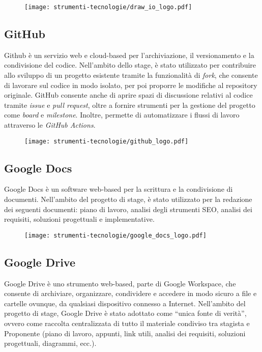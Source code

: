 \begin{figure}[H]
    \centering 
    \texttt{[image: strumenti-tecnologie/draw\_io\_logo.pdf]} 
\end{figure}

\subsection*{GitHub}

\par Github è un servizio web e cloud-based per l'archiviazione, il versionamento e la condivisione del codice. Nell’ambito dello stage, è stato utilizzato per contribuire allo sviluppo di un progetto esistente tramite la funzionalità di \textit{fork}, che consente di lavorare sul codice in modo isolato, per poi proporre le modifiche al repository originale. GitHub consente anche di aprire spazi di discussione relativi al codice tramite \textit{issue} e \textit{pull request}, oltre a fornire strumenti per la gestione del progetto come \textit{board} e \textit{milestone}. Inoltre, permette di automatizzare i flussi di lavoro attraverso le \textit{GitHub Actions}.

\begin{figure}[H]
    \centering 
    \texttt{[image: strumenti-tecnologie/github\_logo.pdf]} 
\end{figure}

\subsection*{Google Docs}

\par Google Docs è un software web-based per la scrittura e la condivisione di documenti. Nell’ambito del progetto di stage, è stato utilizzato per la redazione dei seguenti documenti: piano di lavoro, analisi degli strumenti SEO, analisi dei requisiti, soluzioni progettuali e implementative.

\begin{figure}[H]
    \centering 
    \texttt{[image: strumenti-tecnologie/google\_docs\_logo.pdf]} 
\end{figure}

\subsection*{Google Drive}

\par Google Drive è uno strumento web-based, parte di Google Workspace, che consente di archiviare, organizzare, condividere e accedere in modo sicuro a file e cartelle ovunque, da qualsiasi dispositivo connesso a Internet. Nell’ambito del progetto di stage, Google Drive è stato adottato come “unica fonte di verità”, ovvero come raccolta centralizzata di tutto il materiale condiviso tra stagista e Proponente (piano di lavoro, appunti, link utili, analisi dei requisiti, soluzioni progettuali, diagrammi, ecc.).

